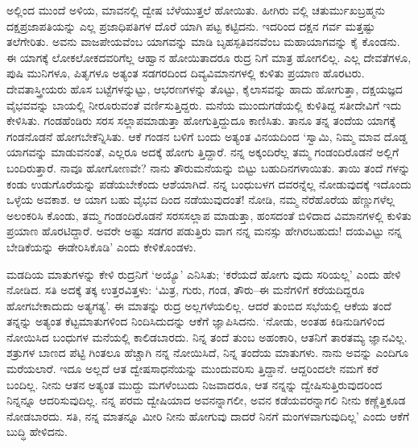 ಅಲ್ಲಿಂದ ಮುಂದೆ ಅಳಿಯ, ಮಾವನಲ್ಲಿ ದ್ವೇಷ ಬೆಳೆಯುತ್ತಲೆ ಹೋಯಿತು. ಹೀಗಿರು ವಲ್ಲಿ ಚತುರ್ಮುಖಬ್ರಹ್ಮನು ದಕ್ಷಪ್ರಜಾಪತಿಯನ್ನು ಎಲ್ಲ ಪ್ರಜಾಧಿಪತಿಗಳ ದೊರೆ ಯಾಗಿ ಪಟ್ಟ ಕಟ್ಟಿದನು. ಇದರಿಂದ ದಕ್ಷನ ಗರ್ವ ಮತ್ತಷ್ಟು ತಲೆಗೇರಿತು. ಅವನು ವಾಜಪೇಯವೆಂಬ ಯಾಗವನ್ನು ಮಾಡಿ ಬೃಹಸ್ಪತಿವನವೆಂಬ ಮಹಾಯಾಗವನ್ನು ಕೈ ಕೊಂಡನು. ಈ ಯಾಗಕ್ಕೆ ಲೋಕಲೋಕದವರಿಗೆಲ್ಲ ಆಹ್ವಾನ ಹೋಯಿತಾದರೂ ರುದ್ರ ನಿಗೆ ಮಾತ್ರ ಹೋಗಲಿಲ್ಲ. ಎಲ್ಲ ದೇವತೆಗಳೂ, ಪುಷಿ ಮುನಿಗಳೂ, ಪಿತೃಗಳೂ ಅತ್ಯಂತ ಸಡಗರದಿಂದ ದಿವ್ಯವಿಮಾನಗಳಲ್ಲಿ ಕುಳಿತು ಪ್ರಯಾಣ ಹೊರಟರು. ದೇವತಾಸ್ತ್ರೀಯರು ಹೊಸ ಬಟ್ಟೆಗಳನ್ನುಟ್ಟು, ಆಭರಣಗಳನ್ನು ತೊಟ್ಟು, ಕೈಲಾಸವನ್ನು ಹಾದು ಹೋಗುತ್ತಾ, ದಕ್ಷಯಜ್ಞದ ವೈಭವವನ್ನು ಬಾಯಲ್ಲಿ ನೀರೂರುವಂತೆ ವರ್ಣಿಸುತ್ತಿದ್ದರು. ಮನೆಯ ಮುಂದುಗಡೆಯಲ್ಲಿ ಕುಳಿತಿದ್ದ ಸತೀದೇವಿಗೆ ಇದು ಕೇಳಿಸಿತು. ಗಂಡಹೆಂಡಿರು ಸರಸ ಸಲ್ಲಾಪಮಾಡುತ್ತಾ ಹೋಗುತ್ತಿದ್ದುದೂ ಕಾಣಿಸಿತು. ತಾನೂ ತನ್ನ ತಂದೆಯ ಯಾಗಕ್ಕೆ ಗಂಡನೊಡನೆ ಹೋಗಬೇಕೆನ್ನಿಸಿತು. ಆಕೆ ಗಂಡನ ಬಳಿಗೆ ಬಂದು ಅತ್ಯಂತ ವಿನಯದಿಂದ ‘ಸ್ವಾಮಿ, ನಿಮ್ಮ ಮಾವ ದೊಡ್ಡ ಯಾಗವನ್ನು ಮಾಡುವನಂತೆ, ಎಲ್ಲರೂ ಅದಕ್ಕೆ ಹೋಗು ತ್ತಿದ್ದಾರೆ. ನನ್ನ ಅಕ್ಕಂದಿರೆಲ್ಲ ತಮ್ಮ ಗಂಡಂದಿರೊಡನೆ ಅಲ್ಲಿಗೆ ಬಂದಿರುತ್ತಾರೆ. ನಾವೂ ಹೋಗೋಣವೇ? ನಾನು ತೌರುಮನೆಯನ್ನು ಬಿಟ್ಟು ಬಹುದಿನಗಳಾಯಿತು. ತಾಯಿ ತಂದೆ ಗಳನ್ನು ಕಂಡು ಉಡುಗೊರೆಯನ್ನು ಪಡೆಯಬೇಕೆಂದು ಆಶೆಯಾಗಿದೆ. ನನ್ನ ಬಂಧುಬಳಗ ದವರನ್ನೆಲ್ಲ ನೋಡುವುದಕ್ಕೆ ಇದೊಂದು ಒಳ್ಳೆಯ ಅವಕಾಶ. ಆ ಯಾಗ ಬಹು ವೈಭವ ದಿಂದ ನಡೆಯುವುದಂತೆ! ನೋಡಿ, ನಮ್ಮ ನೆರೆಹೊರೆಯ ಹೆಣ್ಣುಗಳೆಲ್ಲ ಅಲಂಕರಿಸಿ ಕೊಂಡು, ತಮ್ಮ ಗಂಡಂದಿರೊಡನೆ ಸರಸಸಲ್ಲಾಪ ಮಾಡುತ್ತಾ, ಹಂಸದಂತೆ ಬಿಳಿದಾದ ವಿಮಾನಗಳಲ್ಲಿ ಕುಳಿತು ಪ್ರಯಾಣ ಹೊರಟಿದ್ದಾರೆ. ಅವರೇ ಅಷ್ಟು ಸಡಗರ ಪಡುತ್ತಿರು ವಾಗ ನನ್ನ ಮನಸ್ಸು ಹೇಗಿರಬಹುದು! ದಯವಿಟ್ಟು ನನ್ನ ಬೇಡಿಕೆಯನ್ನು ಈಡೇರಿಸಿಕೊಡಿ’ ಎಂದು ಕೇಳಿಕೊಂಡಳು.

ಮಡದಿಯ ಮಾತುಗಳನ್ನು ಕೇಳಿ ರುದ್ರನಿಗೆ ‘ಅಯ್ಯೊ’ ಎನಿಸಿತು; ‘ಕರೆಯದೆ ಹೋಗು ವುದು ಸರಿಯಲ್ಲ’ ಎಂದು ಹೇಳಿ ನೋಡಿದ. ಸತಿ ಅದಕ್ಕೆ ತಕ್ಕ ಉತ್ತರವಿತ್ತಳು: ‘ಮಿತ್ರ, ಗುರು, ಗಂಡ, ತೌರು–ಈ ಮನೆಗಳಿಗೆ ಕರೆಯದಿದ್ದರೂ ಹೋಗಬೇಕಾದುದು ಅತ್ಯಗತ್ಯ’. ಈ ಮಾತನ್ನು ರುದ್ರ ಅಲ್ಲಗಳೆಯಲಿಲ್ಲ. ಆದರೆ ತುಂಬಿದ ಸಭೆಯಲ್ಲಿ ಆಕೆಯ ತಂದೆ ತನ್ನನ್ನು ಅತ್ಯಂತ ಕೆಟ್ಟಮಾತುಗಳಿಂದ ನಿಂದಿಸಿದುದನ್ನು ಆಕೆಗೆ ಜ್ಞಾಪಿಸಿದನು. ‘ನೋಡು, ಅಂತಹ ಕಿಡಿನುಡಿಗಳಿಂದ ನೋಯಿಸಿದ ಬಂಧುಗಳ ಮನೆಯಲ್ಲಿ ಕಾಲಿಡಬಾರದು. ನಿನ್ನ ತಂದೆ ತುಂಬ ಅಹಂಕಾರಿ, ಆತನಿಗೆ ತಾರತಮ್ಯ ಜ್ಞಾನವಿಲ್ಲ. ಶತ್ರುಗಳ ಬಾಣದ ಪೆಟ್ಟಿ ಗಿಂತಲೂ ಹೆಚ್ಚಾಗಿ ನನ್ನ ನೋಯಿಸಿದೆ, ನಿನ್ನ ತಂದೆಯ ಮಾತುಗಳು. ನಾನು ಅವನ್ನು ಎಂದಿಗೂ ಮರೆಯಲಾರೆ. ಇದೂ ಅಲ್ಲದೆ ಆತ ದ್ವೇಷಸಾಧನೆಯನ್ನು ಮುಂದುವರಿಸು ತ್ತಿದ್ದಾನೆ. ಆದ್ದರಿಂದಲೇ ನಮಗೆ ಕರೆ ಬಂದಿಲ್ಲ. ನೀನು ಆತನ ಅತ್ಯಂತ ಮುದ್ದು ಮಗಳೆಂಬುದು ನಿಜವಾದರೂ, ಆತ ನನ್ನನ್ನು ದ್ವೇಷಿಸುತ್ತಿರುವುದರಿಂದ ನಿನ್ನನ್ನೂ ಆದರಿಸುವುದಿಲ್ಲ. ನನ್ನ ಪರಮ ದ್ವೇಷಿಯಾದ ಅವನನ್ನಾಗಲೀ, ಅವನ ಕಡೆಯವರನ್ನಾಗಲಿ ನೀನು ಕಣ್ಣೆತ್ತಿಕೂಡ ನೋಡಬಾರದು. ಸತಿ, ನನ್ನ ಮಾತನ್ನೂ ಮೀರಿ ನೀನು ಹೋಗುವು ದಾದರೆ ನಿನಗೆ ಮಂಗಳವಾಗುವುದಿಲ್ಲ’ ಎಂದು ಆಕೆಗೆ ಬುದ್ಧಿ ಹೇಳಿದನು.


